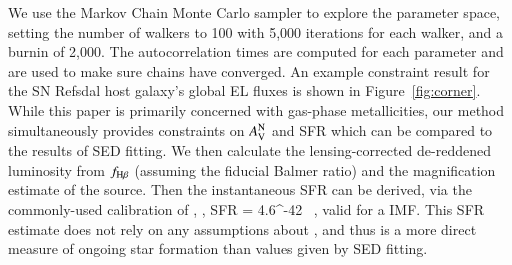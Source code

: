We use the Markov Chain Monte Carlo sampler \emc \citep{ForemanMackey:2013io} to
explore the parameter space, setting the number of walkers to 100 with 5,000 iterations for each walker,
and a burnin of 2,000. The autocorrelation times are computed for
each parameter and are used to make sure chains have converged.
An example constraint result for the SN Refsdal host galaxy's global EL fluxes is shown in Figure~\ref{fig:corner}. While this
paper is primarily concerned with gas-phase metallicities, our method simultaneously provides constraints on $A_{\mathrm V}^{\mathrm N}$ and
SFR which can be compared to the results of SED fitting.
We then calculate the lensing-corrected de-reddened \Ha luminosity from $f_{\textrm{H}\beta}$ (assuming the fiducial Balmer ratio) and the 
magnification estimate of the source.
Then the instantaneous SFR can be derived, via the commonly-used calibration of \citet{Kennicutt:1998ki,Moustakas:2010ke}, \ie,
\be
    {\rm SFR} = 4.6^{-42}~  ,
\ee
valid for a \citet{Chabrier:2003ki} IMF. This SFR estimate does not rely on any assumptions about \sfh, and thus is a more direct 
measure of ongoing star formation than values given by SED fitting.

